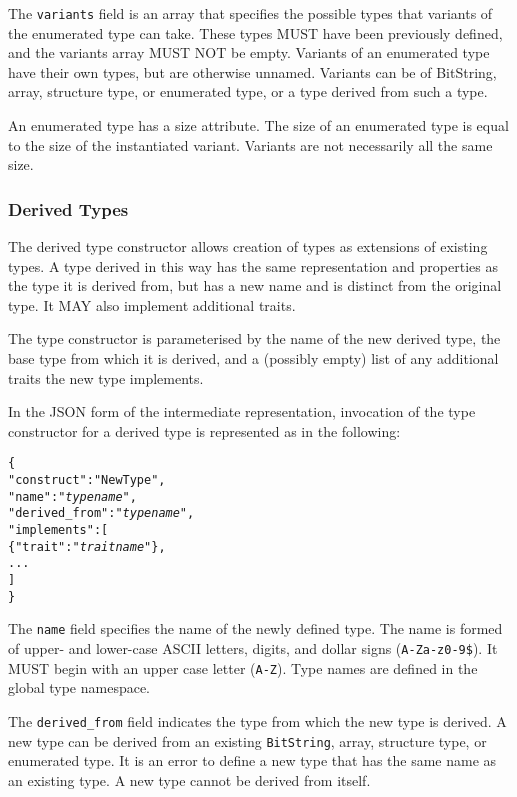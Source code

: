 \documentclass[10pt,twocolumn,a4paper]{article}
\newcommand{\code}[1]{\texttt{#1}}
\begin{document}
The \code{variants} field is an array that specifies the possible types
that variants of the enumerated type can take. These types MUST have been
previously defined, and the variants array MUST NOT be empty. Variants of
an enumerated type have their own types, but are otherwise unnamed.
Variants can be of BitString, array, structure type, or enumerated type, or
a type derived from such a type.

An enumerated type has a size attribute. The size of an enumerated type
is equal to the size of the instantiated variant. Variants are not
necessarily all the same size.

\subsubsection{Derived Types}

The derived type constructor allows creation of types as extensions of
existing types. A type derived in this way has the same representation
and properties as the type it is derived from, but has a new name and is
distinct from the original type. It MAY also implement additional traits.

The type constructor is parameterised by the name of the new derived type,
the base type from which it is derived, and a (possibly empty) list of any
additional traits the new type implements.

In the JSON form of the intermediate representation, invocation of the
type constructor for a derived type is represented as in the following:
\footnotesize
\begin{alltt}
  \{
    "construct"     : "NewType",
    "name"          : "\emph{type name}",
    "derived\_from"  : "\emph{type name}",
    "implements"    : [
      \{"trait" : "\emph{trait name}"\},
      ...
    ]
  \}
\end{alltt}
\normalsize
The \code{name} field specifies the name of the newly defined type. The
name is formed of upper- and lower-case ASCII letters, digits, and dollar
signs (\code{A-Za-z0-9\$}).  It MUST begin with an upper case letter
(\code{A-Z}). Type names are defined in the global type namespace.

The \code{derived\_from} field indicates the type from which the new type is
derived.  A new type can be derived from an existing \code{BitString},
array, structure type, or enumerated type. It is an error to define a new
type that has the same name as an existing type. A new type cannot be
derived from itself.
\end{document}
